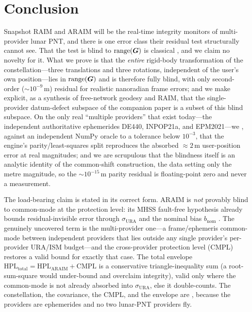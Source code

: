 \section{Conclusion}
\label{sec:conclusion}

Snapshot RAIM and ARAIM will be the real-time integrity monitors of multi-provider
lunar PNT, and there is one error class their residual test structurally cannot see.
That the test is blind to $\operatorname{range}(\bm{G})$ is classical \citep{sturza1988,brown1992,%
parkinson1988}, and we claim no novelty for it. What we prove is that the \emph{entire}
rigid-body transformation of the constellation---three translations and three rotations,
independent of the user's own position---lies in $\operatorname{range}(\bm{G})$ and is therefore fully
blind, with only second-order ($\sim\!10^{-9}\,$m) residual for realistic nanoradian
frame errors; and we make explicit, as a synthesis of free-network geodesy and RAIM,
that the single-provider datum-defect subspace of the companion paper
\citep{baweja2026datum} is a subset of this blind subspace. On the only real ``multiple
providers'' that exist today---the independent authoritative ephemerides DE440,
INPOP21a, and EPM2021---we \Validated{}, against an independent NumPy oracle to a
tolerance below $10^{-3}$, that the engine's parity/least-squares split reproduces the
absorbed $\approx\!2\,$m user-position error at real magnitudes; and we are scrupulous
that the blindness itself is an analytic identity of the common-shift construction, the
data setting only the metre magnitude, so the $\sim\!10^{-15}\,$m parity residual is
floating-point zero and never a measurement.

The load-bearing claim is stated in its correct form. ARAIM is \emph{not} provably blind
to common-mode at the protection level: its MHSS fault-free hypothesis already bounds
residual-invisible error through $\sigma_{\mathrm{URA}}$ and the nominal bias
$b_{\mathrm{nom}}$ \citep{blanch2015,wgc2016araim}. The genuinely uncovered term is the
multi-provider one---a frame/ephemeris common-mode between independent providers that
lies outside any single provider's per-provider URA/ISM budget---and the cross-provider
protection level (CMPL) restores a valid bound for exactly that case. The total envelope
$\mathrm{HPL}_{\mathrm{total}}=\mathrm{HPL}_{\mathrm{ARAIM}}+\mathrm{CMPL}$ is a
conservative triangle-inequality sum (a root-sum-square would under-bound and overclaim
integrity), valid only where the common-mode is not already absorbed into
$\sigma_{\mathrm{URA}}$, else it double-counts. The constellation, the covariance, the
CMPL, and the envelope are \Modelled{}, because the providers are ephemerides and no two
lunar-PNT providers fly.

